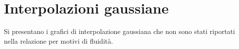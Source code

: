 \section{Interpolazioni gaussiane}

Si presentano i grafici di interpolazione gaussiana che non sono stati riportati nella relazione per motivi di fluidità.

 
 
 
 
 
 
 
 
